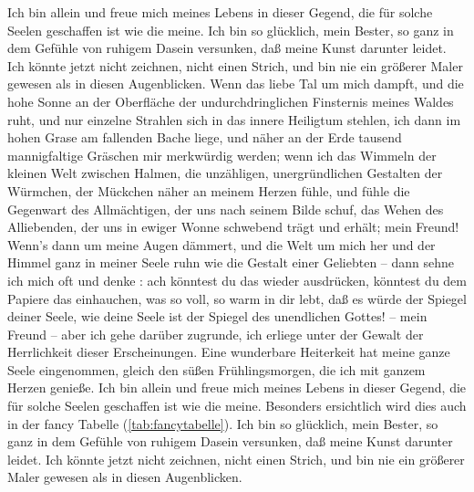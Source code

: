 \documentclass{scrreprt}
\begin{document}
	    Ich bin allein und freue mich meines Lebens in dieser Gegend, die für solche Seelen geschaffen ist wie die meine. Ich bin so glücklich, mein Bester, so ganz in dem Gefühle von ruhigem Dasein versunken, daß meine Kunst darunter leidet. Ich könnte jetzt nicht zeichnen, nicht einen Strich, und bin nie ein größerer Maler gewesen als in diesen Augenblicken. Wenn das liebe Tal um mich dampft, und die hohe Sonne an der Oberfläche der undurchdringlichen Finsternis meines Waldes ruht, und nur einzelne Strahlen sich in das innere Heiligtum stehlen, ich dann im hohen Grase am fallenden Bache liege, und näher an der Erde tausend mannigfaltige Gräschen mir merkwürdig werden; wenn ich das Wimmeln der kleinen Welt zwischen Halmen, die unzähligen, unergründlichen Gestalten der Würmchen, der Mückchen näher an meinem Herzen fühle, und fühle die Gegenwart des Allmächtigen, der uns nach seinem Bilde schuf, das Wehen des Alliebenden, der uns in ewiger Wonne schwebend trägt und erhält; mein Freund! Wenn’s dann um meine Augen dämmert, und die Welt um mich her und der Himmel ganz in meiner Seele ruhn wie die Gestalt einer Geliebten – dann sehne ich mich oft und denke : ach könntest du das wieder ausdrücken, könntest du dem Papiere das einhauchen, was so voll, so warm in dir lebt, daß es würde der Spiegel deiner Seele, wie deine Seele ist der Spiegel des unendlichen Gottes! – mein Freund – aber ich gehe darüber zugrunde, ich erliege unter der Gewalt der Herrlichkeit dieser Erscheinungen. Eine wunderbare Heiterkeit hat meine ganze Seele eingenommen, gleich den süßen Frühlingsmorgen, die ich mit ganzem Herzen genieße. Ich bin allein und freue mich meines Lebens in dieser Gegend, die für solche Seelen geschaffen ist wie die meine. Besonders ersichtlich wird dies auch in der fancy Tabelle (\ref{tab:fancytabelle}). Ich bin so glücklich, mein Bester, so ganz in dem Gefühle von ruhigem Dasein versunken, daß meine Kunst darunter leidet. Ich könnte jetzt nicht zeichnen, nicht einen Strich, und bin nie ein größerer Maler gewesen als in diesen Augenblicken.
		
\end{document}
